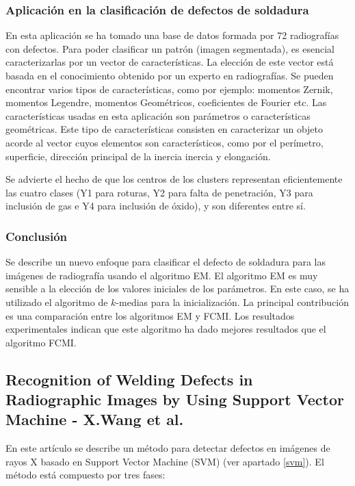 \subsubsection{Aplicación en la clasificación de defectos de soldadura}
En esta aplicación se ha tomado una base de datos formada por 72 radiografías con defectos.
Para poder clasificar un patrón (imagen segmentada), es esencial caracterizarlas por un vector de características. La elección de este vector está basada en el conocimiento obtenido por un experto en radiografías. Se pueden encontrar varios tipos de características, como por ejemplo: momentos Zernik, momentos Legendre, momentos Geométricos, coeficientes de Fourier etc.
Las características usadas en esta aplicación son parámetros o características geométricas. Este tipo de características consisten en caracterizar un objeto acorde al vector cuyos elementos son característicos, como por el perímetro, superficie, dirección principal de la inercia inercia y elongación.

Se advierte el hecho de que los centros de los clusters representan eficientemente las cuatro clases (Y1 para roturas, Y2 para falta de penetración, Y3 para inclusión de gas e Y4 para inclusión de óxido), y son diferentes entre sí. 


\subsubsection{Conclusión}
Se describe un nuevo enfoque para clasificar el defecto de soldadura para las imágenes de radiografía usando el algoritmo EM. El algoritmo EM es muy sensible a la elección de los valores iniciales de los parámetros. En este caso, se ha utilizado el algoritmo de $k$-medias para la inicialización. La principal contribución es una comparación entre los algoritmos EM y FCMI. Los resultados experimentales indican que este algoritmo ha dado mejores resultados que el algoritmo FCMI.



\subsection{Recognition of Welding Defects in Radiographic Images by Using Support Vector Machine - X.Wang et al.}
En este artículo \cite{wang2010recognition} se describe un método para detectar defectos en imágenes de rayos X basado en Support Vector Machine (SVM) (ver apartado \ref{svm}).
El método está compuesto por tres fases:



